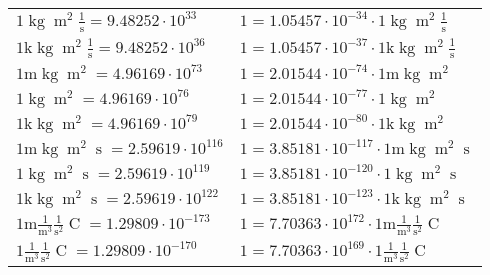 \begin{center}
\begin{longtable}{l l}
{\color{black}$1 \bm{\mathrm{ }}\operatorname{kg}{\operatorname{m}^2}\frac1{\operatorname{s}}{}{} = 9.48252\cdot10^{33} $}   & {\color{black}$ 1 = 1.05457\cdot10^{-34} \cdot 1 \bm{\mathrm{ }}\operatorname{kg}{\operatorname{m}^2}\frac1{\operatorname{s}}{}{}$}  \\
{\color{gray}$1 \bm{\mathrm{ k}}\operatorname{kg}{\operatorname{m}^2}\frac1{\operatorname{s}}{}{} = 9.48252\cdot10^{36} $}   & {\color{gray}$ 1 = 1.05457\cdot10^{-37} \cdot 1 \bm{\mathrm{ k}}\operatorname{kg}{\operatorname{m}^2}\frac1{\operatorname{s}}{}{}$}  \\
{\color{gray}$1 \bm{\mathrm{ m}}\operatorname{kg}{\operatorname{m}^2}{}{}{} = 4.96169\cdot10^{73} $}   & {\color{gray}$ 1 = 2.01544\cdot10^{-74} \cdot 1 \bm{\mathrm{ m}}\operatorname{kg}{\operatorname{m}^2}{}{}{}$}  \\
{\color{black}$1 \bm{\mathrm{ }}\operatorname{kg}{\operatorname{m}^2}{}{}{} = 4.96169\cdot10^{76} $}   & {\color{black}$ 1 = 2.01544\cdot10^{-77} \cdot 1 \bm{\mathrm{ }}\operatorname{kg}{\operatorname{m}^2}{}{}{}$}  \\
{\color{gray}$1 \bm{\mathrm{ k}}\operatorname{kg}{\operatorname{m}^2}{}{}{} = 4.96169\cdot10^{79} $}   & {\color{gray}$ 1 = 2.01544\cdot10^{-80} \cdot 1 \bm{\mathrm{ k}}\operatorname{kg}{\operatorname{m}^2}{}{}{}$}  \\
{\color{gray}$1 \bm{\mathrm{ m}}\operatorname{kg}{\operatorname{m}^2}{\operatorname{s}}{}{} = 2.59619\cdot10^{116} $}   & {\color{gray}$ 1 = 3.85181\cdot10^{-117} \cdot 1 \bm{\mathrm{ m}}\operatorname{kg}{\operatorname{m}^2}{\operatorname{s}}{}{}$}  \\
{\color{black}$1 \bm{\mathrm{ }}\operatorname{kg}{\operatorname{m}^2}{\operatorname{s}}{}{} = 2.59619\cdot10^{119} $}   & {\color{black}$ 1 = 3.85181\cdot10^{-120} \cdot 1 \bm{\mathrm{ }}\operatorname{kg}{\operatorname{m}^2}{\operatorname{s}}{}{}$}  \\
{\color{gray}$1 \bm{\mathrm{ k}}\operatorname{kg}{\operatorname{m}^2}{\operatorname{s}}{}{} = 2.59619\cdot10^{122} $}   & {\color{gray}$ 1 = 3.85181\cdot10^{-123} \cdot 1 \bm{\mathrm{ k}}\operatorname{kg}{\operatorname{m}^2}{\operatorname{s}}{}{}$}  \\
\hline{\color{gray}$1 \bm{\mathrm{ m}}\frac1{\operatorname{m}^3}\frac1{\operatorname{s}^2}{\operatorname{C}}{} = 1.29809\cdot10^{-173} $}   & {\color{gray}$ 1 = 7.70363\cdot10^{172} \cdot 1 \bm{\mathrm{ m}}\frac1{\operatorname{m}^3}\frac1{\operatorname{s}^2}{\operatorname{C}}{}$}  \\
{\color{black}$1 \bm{\mathrm{ }}\frac1{\operatorname{m}^3}\frac1{\operatorname{s}^2}{\operatorname{C}}{} = 1.29809\cdot10^{-170} $}   & {\color{black}$ 1 = 7.70363\cdot10^{169} \cdot 1 \bm{\mathrm{ }}\frac1{\operatorname{m}^3}\frac1{\operatorname{s}^2}{\operatorname{C}}{}$}  \\

\end{longtable}
\end{center}
